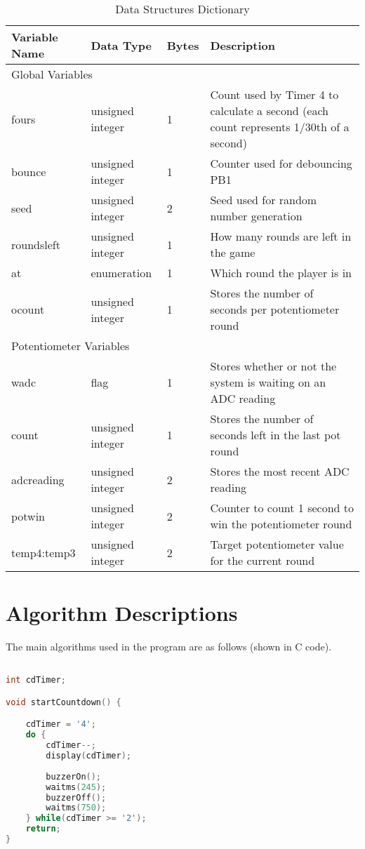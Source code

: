 \documentclass[a4paper]{article}
\begin{document}
\begin{table}[H]
\centering
\caption{Data Structures Dictionary}
\label{tbl:dict}
\begin{tabular}{@{}lllp{9cm}@{}}
\toprule
Variable Name & Data Type        & Bytes & Description \\ \midrule
\multicolumn{4}{l}{Global Variables} \\ \midrule
fours         & unsigned integer & 1     & Count used by Timer 4 to calculate a second (each count represents 1/30th of a second) \\
bounce        & unsigned integer & 1     & Counter used for debouncing PB1 \\
seed          & unsigned integer & 2     & Seed used for random number generation \\
roundsleft    & unsigned integer & 1     & How many rounds are left in the game \\
at            & enumeration      & 1     & Which round the player is in \\
ocount        & unsigned integer & 1     & Stores the number of seconds per potentiometer round \\ \midrule
\multicolumn{4}{l}{Potentiometer Variables} \\ \midrule
wadc          & flag             & 1     & Stores whether or not the system is waiting on an ADC reading \\
count         & unsigned integer & 1     & Stores the number of seconds left in the last pot round \\
adcreading	& unsigned integer	& 2 & Stores the most recent ADC reading \\  
potwin		& unsigned integer	& 2	& Counter to count 1 second to win the potentiometer round \\ 
temp4:temp3	& unsigned integer	& 2	& Target potentiometer value for the current round \\

\bottomrule
\end{tabular}
\end{table}

\section{Algorithm Descriptions}

The main algorithms used in the program are as follows (shown in C code).

\begin{lstlisting}[language=C, caption={Algorithm for \texttt{startCountdown()}}]

int cdTimer;

void startCountdown() {

	cdTimer = '4';
	do {
		cdTimer--;
		display(cdTimer);
		
		buzzerOn();
		waitms(245);
		buzzerOff();
		waitms(750);
	} while(cdTimer >= '2');
	return;
}		

\end{lstlisting}
\end{document}
